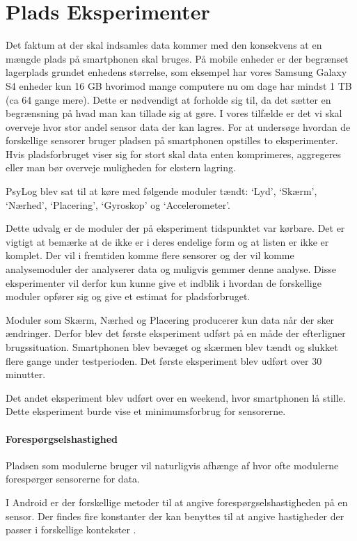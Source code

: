 \section{Plads Eksperimenter}\label{eksperimenter}
Det faktum at der skal indsamles data kommer med den konsekvens at en mængde plads på smartphonen skal bruges.
På mobile enheder er der begrænset lagerplads grundet enhedens størrelse, som eksempel har vores Samsung Galaxy S4 enheder kun 16 GB hvorimod mange computere nu om dage har mindst 1 TB (ca 64 gange mere).
Dette er nødvendigt at forholde sig til, da det sætter en begrænsning på hvad man kan tillade sig at gøre.
I vores tilfælde er det vi skal overveje hvor stor andel sensor data der kan lagres.
For at undersøge hvordan de forskellige sensorer bruger pladsen på smartphonen opstilles to eksperimenter.
Hvis pladsforbruget viser sig for stort skal data enten komprimeres, aggregeres eller man bør overveje muligheden for ekstern lagring.

PsyLog blev sat til at køre med følgende moduler tændt: `Lyd', `Skærm', `Nærhed', `Placering', `Gyroskop' og `Accelerometer'.

Dette udvalg er de moduler der på eksperiment tidspunktet var kørbare.
Det er vigtigt at bemærke at de ikke er i deres endelige form og at listen er ikke er komplet.
Der vil i fremtiden komme flere sensorer og der vil komme analysemoduler der analyserer data og muligvis gemmer denne analyse.
Disse eksperimenter vil derfor kun kunne give et indblik i hvordan de forskellige moduler opfører sig og give et estimat for pladsforbruget.

Moduler som Skærm, Nærhed og Placering producerer kun data når der sker ændringer. 
Derfor blev det første eksperiment udført på en måde der efterligner brugssituation. 
Smartphonen blev bevæget og skærmen blev tændt og slukket flere gange under testperioden.
Det første eksperiment blev udført over 30 minutter.

Det andet eksperiment blev udført over en weekend, hvor smartphonen lå stille.
Dette eksperiment burde vise et minimumsforbrug for sensorerne.

\paragraph{Forespørgselshastighed}
Pladsen som modulerne bruger vil naturligvis afhænge af hvor ofte modulerne forespørger sensorerne for data.

I Android er der forskellige metoder til at angive forespørgselshastigheden på en sensor.
Der findes fire konstanter der kan benyttes til at angive hastigheder der passer i forskellige kontekster \cite{sensormonitor}.

